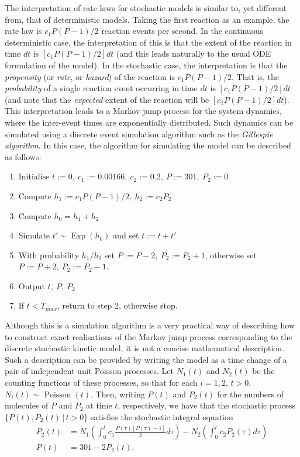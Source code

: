 The interpretation of rate laws for stochastic models is similar
to, yet different from, that of deterministic models. Taking the
first reaction as an example, the rate law is $c_1P(P-1)/2$ reaction
events per second. In the continuous deterministic case, the
interpretation of this is that the extent of the reaction in time
$dt$ is $[c_1P(P-1)/2]dt$ (and this leads naturally to the usual ODE
formulation of the model). In the stochastic case, the
interpretation is that the \emph{propensity} (or \emph{rate}, or
\emph{hazard}) of the reaction is $c_1P(P-1)/2$. That is, the
\emph{probability} of a single reaction event occurring in time
$dt$ is $[c_1P(P-1)/2]dt$ (and note that the \emph{expected} extent of
the reaction will be $[c_1P(P-1)/2]dt$). This interpretation leads to a Markov
jump process for the system dynamics, where the inter-event times
are exponentially distributed. Such dynamics can be simulated
using a discrete event simulation algorithm such as the
\emph{Gillespie algorithm}. In this case, the algorithm for
simulating the model can be described as follows:
\begin{enumerate}
\item Initialise $t:=0,\ c_1:=0.00166,\ c_2:=0.2,\ P:=301,\ P_2:=0$
\item Compute $h_1:=c_1P(P-1)/2,\ h_2:=c_2P_2$
\item Compute $h_0=h_1+h_2$
\item Simulate $t'\sim \operatorname{Exp}(h_0)$ and set $t:=t+t'$
\item With probability $h_1/h_0$ set $P:=P-2,\ P_2:=P_2+1$,
otherwise set $P:=P+2,\ P_2:=P_2-1$.
\item Output $t,\ P,\ P_2$
\item If $t<T_{max}$, return to step 2, otherwise stop.
\end{enumerate}
Although this is a simulation algorithm is a very practical way of
describing how to construct exact realisations of the Markov jump
process corresponding to the discrete stochastic kinetic model, it
is not a concise mathematical description. Such a description can
be provided by writing the model as a time change of a pair of
independent unit Poisson processes. Let $N_1(t)$ and $N_2(t)$ be
the counting functions of these processes, so that for each
$i=1,2$, $t>0$, $N_i(t)\sim \operatorname{Poisson}(t)$. Then,
writing $P(t)$ and $P_2(t)$ for the numbers of molecules of $P$
and $P_2$ at time $t$, respectively, we have that the stochastic process
$\{P(t),P_2(t)\,|\,t>0\}$ satisfies the stochastic integral equation
\begin{align*}
P_2(t) &= N_1\left(\int_0^t
c_1\frac{P(\tau)[P(\tau)-1]}{2}d\tau\right) - N_2\left(\int_0^t
c_2 P_2(\tau)d\tau\right) \\
P(t) &= 301 - 2P_2(t).
\end{align*}
